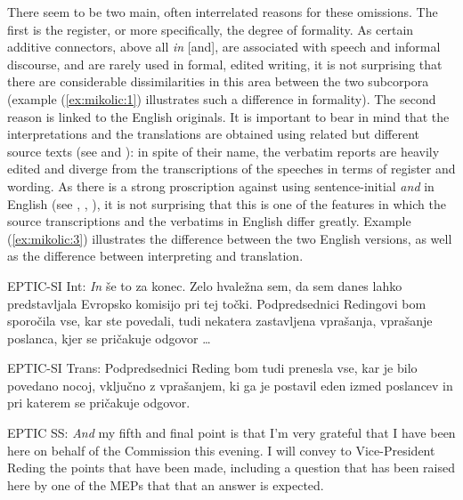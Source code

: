 \documentclass[output=paper]{langscibook}
\begin{document}
There seem to be two main, often interrelated reasons for these omissions. The first is the register, or more specifically, the degree of formality. As certain additive connectors, above all \textit{in} [and], are associated with speech and informal discourse, and are rarely used in formal, edited writing, it is not surprising that there are considerable dissimilarities in this area between the two subcorpora (example (\ref{ex:mikolic:1}) illustrates such a difference in formality). The second reason is linked to the English originals. It is important to bear in mind that the interpretations and the translations are obtained using related but different source texts (see  and \citealt[68]{BernardiniEtAl2016}): in spite of their name, the verbatim reports are heavily edited and diverge from the transcriptions of the speeches in terms of register and wording. As there is a strong proscription against using sentence-initial \textit{and} in English (see \citealt{BiberEtAl1999}, \citealt{Dorgeloh2004}, \citealt{Bell2007}), it is not surprising that this is one of the features in which the source transcriptions and the verbatims in English differ greatly. Example (\ref{ex:mikolic:3}) illustrates the difference between the two English versions, as well as the difference between interpreting and translation.

\ea\label{ex:mikolic:3}
\ea
EPTIC-SI Int: \textit{In} še to za konec. Zelo hvaležna sem, da sem danes lahko predstavljala Evropsko komisijo pri tej točki. Podpredsednici Redingovi bom sporočila vse, kar ste povedali, tudi nekatera zastavljena vprašanja, vprašanje poslanca, kjer se pričakuje odgovor \ldots\\

\ex
EPTIC-SI Trans: Podpredsednici Reding bom tudi prenesla vse, kar je bilo povedano nocoj, vključno z vprašanjem, ki ga je postavil eden izmed poslancev in pri katerem se pričakuje odgovor.

\ex
\glt EPTIC SS: \textit{And} my fifth and final point is that I'm very grateful that I have been here on behalf of the Commission this evening. I will convey to Vice-President Reding the points that have been made, including a question that has been raised here by one of the MEPs that that an answer is expected.
\end{document}
